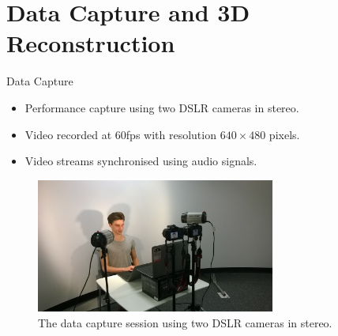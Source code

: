 \documentclass{beamer}
\begin{document}
\section{Data Capture and 3D Reconstruction}
\begin{frame}{Data Capture}

\begin{itemize}
\setlength\itemsep{0.5em}
\item Performance capture using two DSLR cameras in stereo.
\item Video recorded at 60fps with resolution $640 \times 480$ pixels.
\item Video streams synchronised using audio signals.
\end{itemize}

\begin{center}
\begin{figure}
\includegraphics[width=0.7\textwidth]{img/setup1}
\caption{\tiny{The data capture session using two DSLR cameras in stereo.}}
\end{figure}
\end{center}

\end{frame}
\end{document}
